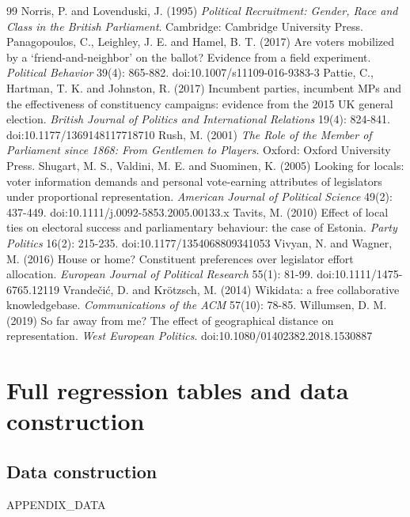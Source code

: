 \documentclass[11pt,a4paper]{article}
\begin{document}
\begin{thebibliography}{99}
 Norris, P. and Lovenduski, J. (1995) \textit{Political Recruitment: Gender, Race and Class in the British Parliament}. Cambridge: Cambridge University Press.
 Panagopoulos, C., Leighley, J. E. and Hamel, B. T. (2017) Are voters mobilized by a `friend-and-neighbor' on the ballot? Evidence from a field experiment. \textit{Political Behavior} 39(4): 865-882. doi:10.1007/s11109-016-9383-3
 Pattie, C., Hartman, T. K. and Johnston, R. (2017) Incumbent parties, incumbent MPs and the effectiveness of constituency campaigns: evidence from the 2015 UK general election. \textit{British Journal of Politics and International Relations} 19(4): 824-841. doi:10.1177/1369148117718710
 Rush, M. (2001) \textit{The Role of the Member of Parliament since 1868: From Gentlemen to Players}. Oxford: Oxford University Press.
 Shugart, M. S., Valdini, M. E. and Suominen, K. (2005) Looking for locals: voter information demands and personal vote-earning attributes of legislators under proportional representation. \textit{American Journal of Political Science} 49(2): 437-449. doi:10.1111/j.0092-5853.2005.00133.x
 Tavits, M. (2010) Effect of local ties on electoral success and parliamentary behaviour: the case of Estonia. \textit{Party Politics} 16(2): 215-235. doi:10.1177/1354068809341053
 Vivyan, N. and Wagner, M. (2016) House or home? Constituent preferences over legislator effort allocation. \textit{European Journal of Political Research} 55(1): 81-99. doi:10.1111/1475-6765.12119
 Vrande\v{c}i\'c, D. and Kr\"otzsch, M. (2014) Wikidata: a free collaborative knowledgebase. \textit{Communications of the ACM} 57(10): 78-85.
 Willumsen, D. M. (2019) So far away from me? The effect of geographical distance on representation. \textit{West European Politics}. doi:10.1080/01402382.2018.1530887
\end{thebibliography}

\appendix
\section{Full regression tables and data construction}
\subsection{Data construction}
{{APPENDIX_DATA}}
\end{document}
